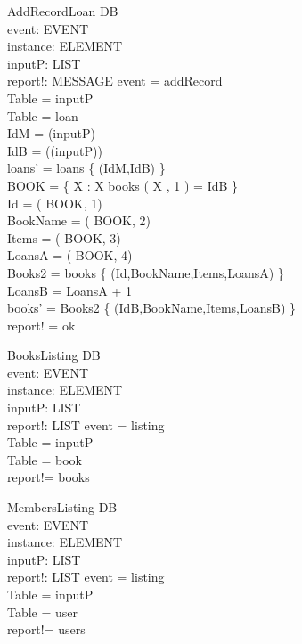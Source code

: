 \begin{schema}{AddRecordLoan}
\Delta DB \\
event: EVENT \\
instance: ELEMENT \\
inputP: LIST \\
report!: MESSAGE 
\where event = addRecord \\
Table = \head inputP \\
Table = loan \\
IdM = \head (\tail inputP) \\
IdB = \head (\tail (\tail inputP)) \\
loans' = loans \uni \{ (IdM,IdB) \} \\
BOOK = \{ X : \nat \bbar X \mem books \land \nth( X , 1 ) = IdB  \} \\
Id = \nth( \head BOOK, 1) \\
BookName = \nth( \head BOOK, 2) \\
Items = \nth( \head BOOK, 3) \\
LoansA = \nth( \head BOOK, 4) \\
Books2 = books \setminus \{ (Id,BookName,Items,LoansA) \} \\
LoansB = LoansA + 1 \\
books' = Books2 \uni \{ (IdB,BookName,Items,LoansB) \} \\
report! = ok 
\end{schema}

\begin{schema}{BooksListing}
\Delta DB \\
event: EVENT \\
instance: ELEMENT \\
inputP: LIST \\
report!: LIST
\where event = listing \\
Table = \head inputP \\
Table = book \\
report!= books
\end{schema}

\begin{schema}{MembersListing}
\Delta DB \\
event: EVENT \\
instance: ELEMENT \\
inputP: LIST \\
report!: LIST
\where event = listing \\
Table = \head inputP \\
Table = user \\
report!= users
\end{schema}

